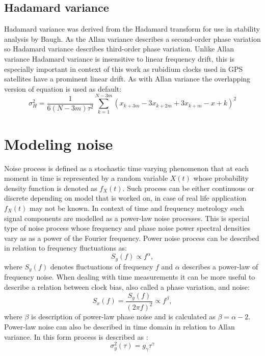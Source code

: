 \subsection{Hadamard variance}
Hadamard variance was derived from the Hadamard transform for use in stability analysis by 
Baugh.  As the Allan variance describes a second-order phase variation so Hadamard variance 
describes third-order phase variation.
Unlike Allan variance Hadamard variance is insensitive to linear frequency drift, this is 
especially important in context of this work as rubidium clocks used in GPS satellites have a 
prominent linear drift.
As with Allan variance the overlapping version of equation is used as default:
\begin{equation}
	\label{equ:overlapping_hadamard}
	\sigma^{2}_{H} = \frac{1}{6(N-3m)\tau^2}
	\sum^{N-3m}_{k=1}(x_{k+3m}-3x_{k+2m}+3x_{k+m}-x+{k})^{2}
\end{equation}

\section{Modeling noise}
Noise process is defined as a stochastic time varying phenomenon that at each moment in time is
represented by a random variable $X(t)$ whose probability density function is denoted as $f_{X}(t)$.
Such process can be either continuous or discrete depending on model that is worked on, in case 
of real life application $f_{X}(t)$ may not be known.
In context of time and frequency metrology such signal components are modelled as a power-law
noise processes. This is special type of noise process whose frequency and phase noise power 
spectral densities vary as as a power of the Fourier frequency.
Power noise process can be described in relation to frequency fluctuations as:
\begin{equation}
	\label{equ:power_noise_freq}
	S_{y}(f) \propto f^{\alpha},
\end{equation}
where $S_{y}(f)$ denotes fluctuations of frequency $f$ and $\alpha$ describes a power-law of
frequency noise.
When dealing with time measurements it can be more useful to describe a relation between clock 
bias, also called a phase variation, and noise:
\begin{equation}
	\label{equ:power_noise_phase}
	S_{x}(f)=\frac{S_{y}(f)}{(2\pi f)^2} \propto f^{\beta},
\end{equation}
where $\beta$ is description of power-law phase noise and is calculated as $\beta=\alpha-2$.
Power-law noise can also be described in time domain in relation to Allan variance.
In this form process is described as :
\begin{equation}
	\label{equ:power_noise_time}
	\sigma^{2}_{y}(\tau)=g_{\gamma}\tau^{\gamma}
\end{equation}

